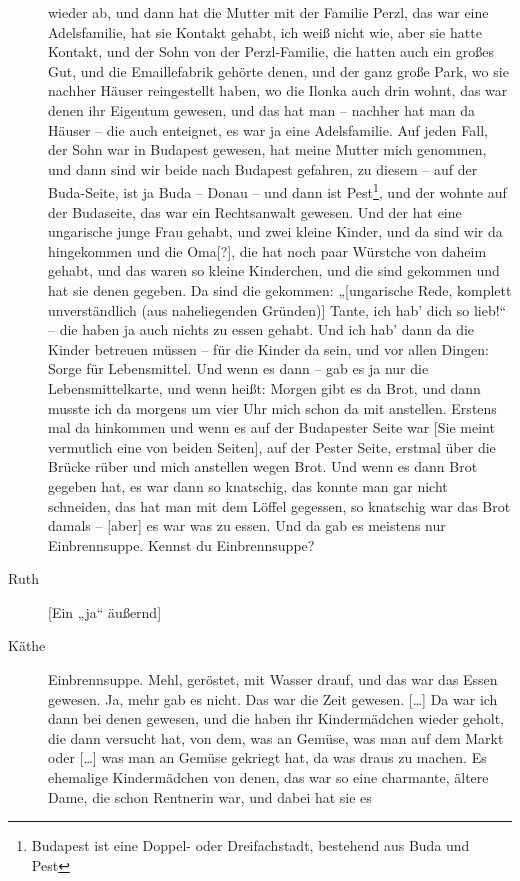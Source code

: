 \documentclass[ngerman,]{article}
\begin{document}
\begin{multicols}{3}
\begin{description}
wieder ab, und dann hat die Mutter mit der Familie Perzl, das war eine
Adelsfamilie, hat sie Kontakt gehabt, ich weiß nicht wie, aber sie hatte
Kontakt, und der Sohn von der Perzl-Familie, die hatten auch ein großes
Gut, und die Emaillefabrik gehörte denen, und der ganz große Park, wo
sie nachher Häuser reingestellt haben, wo die Ilonka auch drin wohnt,
das war denen ihr Eigentum gewesen, und das hat man – nachher hat man da
Häuser – die auch enteignet, es war ja eine Adelsfamilie. Auf jeden
Fall, der Sohn war in Budapest gewesen, hat meine Mutter mich genommen,
und dann sind wir beide nach Budapest gefahren, zu diesem – auf der
Buda-Seite, ist ja Buda – Donau – und dann ist Pest\footnote{Budapest
  ist eine Doppel- oder Dreifachstadt, bestehend aus Buda und Pest}, und
der wohnte auf der Budaseite, das war ein Rechtsanwalt gewesen. Und der
hat eine ungarische junge Frau gehabt, und zwei kleine Kinder, und da
sind wir da hingekommen und die Oma{[}?{]}, die hat noch paar Würstche
von daheim gehabt, und das waren so kleine Kinderchen, und die sind
gekommen und hat sie denen gegeben. Da sind die gekommen: „{[}ungarische
Rede, komplett unverständlich (aus naheliegenden Gründen){]} Tante, ich
hab' dich so lieb!“ – die haben ja auch nichts zu essen gehabt. Und ich
hab' dann da die Kinder betreuen müssen – für die Kinder da sein, und
vor allen Dingen: Sorge für Lebensmittel. Und wenn es dann – gab es ja
nur die Lebensmittelkarte, und wenn heißt: Morgen gibt es da Brot, und
dann musste ich da morgens um vier Uhr mich schon da mit anstellen.
Erstens mal da hinkommen und wenn es auf der Budapester Seite war {[}Sie
meint vermutlich eine von beiden Seiten{]}, auf der Pester Seite,
erstmal über die Brücke rüber und mich anstellen wegen Brot. Und wenn es
dann Brot gegeben hat, es war dann so knatschig, das konnte man gar
nicht schneiden, das hat man mit dem Löffel gegessen, so knatschig war
das Brot damals – {[}aber{]} es war was zu essen. Und da gab es meistens
nur Einbrennsuppe. Kennst du Einbrennsuppe?
\item[Ruth]
{[}Ein „ja“ äußernd{]}
\item[Käthe]
Einbrennsuppe. Mehl, geröstet, mit Wasser drauf, und das war das Essen
gewesen. Ja, mehr gab es nicht. Das war die Zeit gewesen. {[}\ldots{}{]}
Da war ich dann bei denen gewesen, und die haben ihr Kindermädchen
wieder geholt, die dann versucht hat, von dem, was an Gemüse, was man
auf dem Markt oder {[}\ldots{}{]} was man an Gemüse gekriegt hat, da was
draus zu machen. Es ehemalige Kindermädchen von denen, das war so eine
charmante, ältere Dame, die schon Rentnerin war, und dabei hat sie es

\end{description}
\end{multicols}
\end{document}
